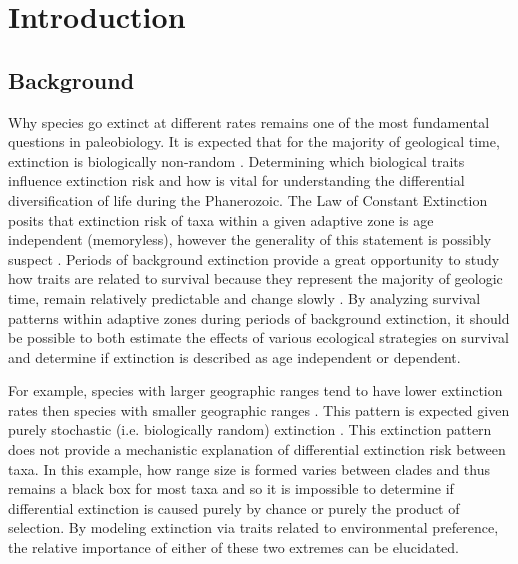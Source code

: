 \documentclass[11pt,letterpaper]{article}
\begin{document}
\section{Introduction}
\subsection{Background}
Why species go extinct at different rates remains one of the most fundamental questions in paleobiology. It is expected that for the majority of geological time, extinction is biologically non-random \citep{Jablonski1986,Alexander1977,Harnik2011,Johnson2002b,Kitchell1986,Nurnberg2013a,Payne2007}. Determining which biological traits influence extinction risk and how is vital for understanding the differential diversification of life during the Phanerozoic. The Law of Constant Extinction \citep{VanValen1973} posits that extinction risk of taxa within a given adaptive zone is age independent (memoryless), however the generality of this statement is possibly suspect \citep{Drake2014,Raup1975,Sepkoski1975,Finnegan2008}. Periods of background extinction provide a great opportunity to study how traits are related to survival because they represent the majority of geologic time, remain relatively predictable and change slowly \citep{Jablonski1986,Raup1988}. By analyzing survival patterns within adaptive zones during periods of background extinction, it should be possible to both estimate the effects of various ecological strategies on survival and determine if extinction is described as age independent or dependent.

For example, species with larger geographic ranges tend to have lower extinction rates then species with smaller geographic ranges \citep{Jablonski1986,Harnik2013,Nurnberg2013a,Jablonski2003,Roy2009c}. This pattern is expected given purely stochastic (i.e. biologically random) extinction \citep{Raup1991b}. This extinction pattern does not provide a mechanistic explanation of differential extinction risk between taxa. In this example, how range size is formed varies between clades and thus remains a black box for most taxa \citep{Jablonski1987} and so it is impossible to determine if differential extinction is caused purely by chance or purely the product of selection. By modeling extinction via traits related to environmental preference, the relative importance of either of these two extremes can be elucidated.
\end{document}
